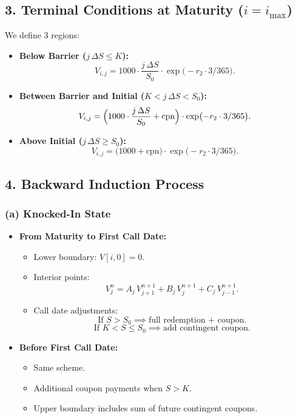 \documentclass[12pt,a4paper]{article}
\begin{document}
\subsection*{3. Terminal Conditions at Maturity (\(i=i_{\max}\))}
We define 3 regions:
\begin{itemize}
  \item \textbf{Below Barrier (\(j\,\Delta S \le K\)):}
  \[
    V_{i,j} = 1000 \cdot \frac{j\,\Delta S}{S_0} \cdot \exp\bigl(-r_2 \cdot 3/365\bigr).
  \]
  \item \textbf{Between Barrier and Initial (\(K < j\,\Delta S < S_0\)):}
  \[
    V_{i,j} = \Bigl(1000 \cdot \frac{j\,\Delta S}{S_0} + \text{cpn}\Bigr)
             \cdot \exp\bigl(-r_2 \cdot 3/365\bigr).
  \]
  \item \textbf{Above Initial (\(j\,\Delta S \ge S_0\)):}
  \[
    V_{i,j} = \bigl(1000 + \text{cpn}\bigr)
              \cdot \exp\bigl(-r_2 \cdot 3/365\bigr).
  \]
\end{itemize}

\subsection*{4. Backward Induction Process}

\subsubsection*{(a) Knocked-In State}
\begin{itemize}
\item \textbf{From Maturity to First Call Date:}
  \begin{itemize}
  \item Lower boundary: \(V[i,0] = 0.\)
  \item Interior points:
    \[
      V_j^n 
       = A_j \, V_{j+1}^{n+1} 
         + B_j \, V_j^{n+1} 
         + C_j \, V_{j-1}^{n+1}.
    \]
  \item Call date adjustments:
    \[
      \text{If } S > S_0 \implies \text{full redemption + coupon}.
    \]
    \[
      \text{If } K < S \le S_0 \implies \text{add contingent coupon}.
    \]
  \end{itemize}

\item \textbf{Before First Call Date:}
  \begin{itemize}
  \item Same scheme.
  \item Additional coupon payments when \(S > K\).
  \item Upper boundary includes sum of future contingent coupons.
  \end{itemize}
\end{itemize}
\end{document}
